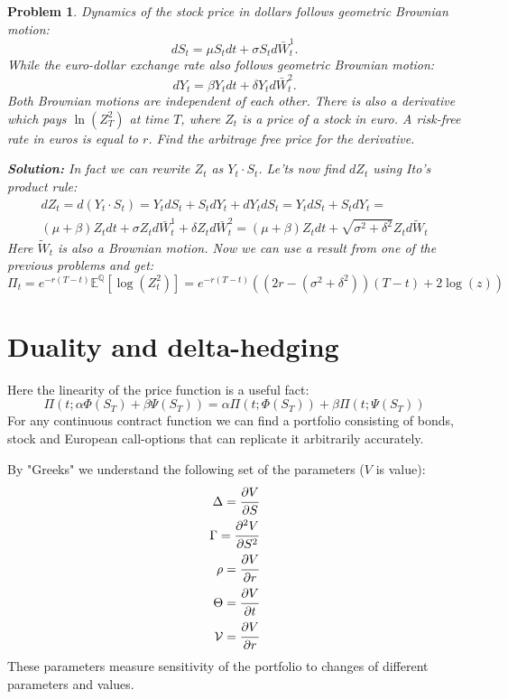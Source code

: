 \documentclass[a4paper, 12pt]{article}
\theoremstyle{problemstyle}
\newtheorem{problem}{Problem}[section]
\newenvironment{solution}
{\textit{\textbf{Solution:}}}
{}
\newcommand{\E}{\mathbb{E}}
\begin{document}
\begin{problem}
	Dynamics of the stock price in dollars follows geometric Brownian motion:
	\begin{equation}
	dS_t = \mu S_t dt + \sigma S_t d\bar{W}^1_t.
	\end{equation}
	While the euro-dollar exchange rate also follows geometric Brownian motion:
		\begin{equation}
	dY_t = \beta Y_t dt + \delta Y_t d\bar{W}^2_t.
	\end{equation}
	Both Brownian motions are independent of each other. There is also a derivative which pays $\ln(Z_T^2)$ at time $T$, where $Z_t$ is a price of a stock in euro. A risk-free rate in euros is equal to $r$.  Find the arbitrage free price for the derivative. 
	
	\begin{solution}
		In fact we can rewrite $Z_t$ as $Y_t \cdot S_t$. Le'ts now find $dZ_t$ using Ito's product rule:
		\begin{multline}
		dZ_t = d(Y_t \cdot S_t) = Y_t dS_t + S_t dY_t + dY_t dS_t =
		 Y_t dS_t + S_t dY_t  = \\
		 (\mu + \beta) Z_t dt + \sigma Z_t d\bar{W}^1_t + \delta Z_t d\bar{W}^2_t = (\mu + \beta) Z_t dt + \sqrt{\sigma^2 + \delta^2} Z_t d \tilde{W}_t
		\end{multline}
				Here $\tilde{W}_t$ is also a Brownian motion. Now we can use a result from one of the previous problems and get:
		\begin{equation}
		\Pi_t = e^{-r(T-t)}\E^{\mathbb{Q}}[\log(Z_t^2)] =
			e^{-r(T-t)}((2r  - (\sigma^2 + \delta^2))(T-t) + 2\log(z)) 
		\end{equation}
	\end{solution}
	
\end{problem}

\section{Duality and delta-hedging}
Here the linearity of the price function is a useful fact:
\begin{equation}
\Pi(t; \alpha \Phi(S_T) + \beta \Psi(S_T))   =
\alpha \Pi(t;\Phi(S_T)) +\beta \Pi(t;\Psi(S_T))
\end{equation}
For any continuous contract function we can find a portfolio consisting of bonds, stock and European call-options that can replicate it arbitrarily accurately. 

By "Greeks" we understand the following set of the parameters ($V$ is value):
\begin{eqnarray}
\Delta = \cfrac{\partial V}{\partial S} \\
\Gamma = \cfrac{\partial^2 V}{\partial S^2} \\
\rho = \cfrac{\partial V}{\partial r} \\
\Theta = \cfrac{\partial V}{\partial t} \\
\mathcal{V} = \cfrac{\partial V}{\partial r} \\
\end{eqnarray}
These parameters measure sensitivity of the portfolio to changes of different parameters and values.
\end{document}
